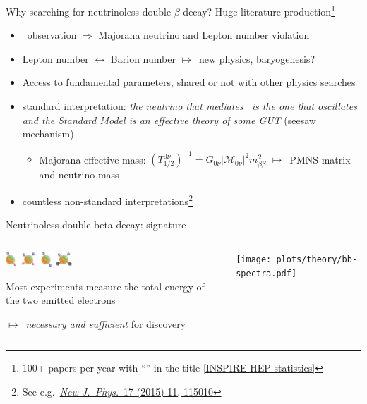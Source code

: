 \documentclass[10pt,aspectratio=169]{beamer}
\newcommand{\arrow}{$\longmapsto$}
\begin{document}
\begin{frame}{Why searching for neutrinoless double-$\beta$ decay?}
  Huge literature production\footnote{%
    100+ papers per year with ``\onbb'' in the title
    \href{https://inspirehep.net/literature?sort=mostrecent&size=25&page=1&q=find\%20t\%20\%CE\%B2\%CE\%B2\%20or\%20double-beta\%20or\%20double\%20beta\%20or\%20double\%20\%CE\%B2\%20or\%20double-\%CE\%B2\%20or\%200\%CE\%BD\%CE\%B2\%CE\%B2&ui-citation-summary=true}{[INSPIRE-HEP statistics]}
  }
  \begin{itemize}
    \item \onbb\ observation $\Rightarrow$ \alert{Majorana neutrino} and \alert{Lepton number violation}
    \item Lepton number $\longleftrightarrow$ Barion number \arrow\
      \alert{new physics}, \alert{baryogenesis?}
    \item Access to fundamental parameters, shared or not with other
      physics searches
    \item \alert{standard interpretation}: \emph{the neutrino that mediates
      \onbb\ is the one that oscillates and the Standard Model is an effective
      theory of some GUT} (seesaw mechanism)
    \begin{itemize}
      \item Majorana effective mass:
        $(T^{0\nu}_{1/2})^{-1}=G_{0\nu} |\mathcal{M}_{0\nu}|^2 m_{\beta\beta}^2$
        \arrow\ PMNS matrix and neutrino mass
    \end{itemize}
  \item countless non-standard interpretations\footnote{See e.g.~\href{https://doi.org/10.1088/1367-2630/17/11/115010}{\emph{New J.~Phys.}~17 (2015) 11, 115010}}
  \end{itemize}
\end{frame}
\begin{frame}{Neutrinoless double-beta decay: signature}
  \begin{columns}
    \begin{column}{0.5\textwidth}
      \begin{center}
        \includegraphics[width=2.5cm,angle=-90,clip,trim=200 0 500 0]{plots/theory/bb-artist-newphy.png}
      \end{center}

      Most experiments measure the \alert{total energy of the two emitted
      electrons}

      \vspace*{16pt}
      \arrow\ \emph{necessary and sufficient} for discovery
    \end{column}
    \begin{column}{0.5\textwidth}
      \begin{center}
        \texttt{[image: plots/theory/bb-spectra.pdf]}
      \end{center}
    \end{column}
  \end{columns}
\end{frame}
\end{document}
